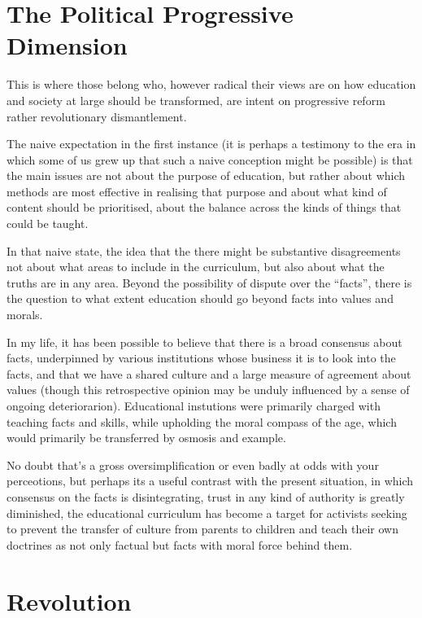 \documentclass[10pt,titlepage]{book}
\begin{document}
\section{The Political Progressive Dimension}

This is where those belong who, however radical their views are on how education and society at large should be transformed, are intent on progressive reform rather revolutionary dismantlement.

The naive expectation in the first instance (it is perhaps a testimony to the era in which some of us grew up that such a naive conception might be possible) is that the main issues are not about the purpose of education, but rather about which methods are most effective in realising that purpose and about what kind of content should be prioritised, about the balance across the kinds of things that could be taught.

In that naive state, the idea that the there might be substantive disagreements not about what areas to include in the curriculum, but also about what the truths are in any area.
Beyond the possibility of dispute over the ``facts'', there is the question to what extent education should go beyond facts into values and morals.

In my life, it has been possible to believe that there is a broad consensus about facts, underpinned by various institutions whose business it is to look into the facts, and that we have a shared culture and a large measure of agreement about values (though this retrospective opinion may be unduly influenced by a sense of ongoing deteriorarion).
Educational instutions were primarily charged with teaching facts and skills, while upholding the moral compass of the age, which would primarily be transferred by osmosis and example.

No doubt that's a gross oversimplification or even badly at odds with your perceotions, but perhaps its a useful contrast with the present situation, in which consensus on the facts is disintegrating, trust in any kind of authority is greatly diminished, the educational curriculum has become a target for activists seeking to prevent the transfer of culture from parents to children and teach their own doctrines as not only factual but facts with moral force behind them.

\section{Revolution}
\end{document}
